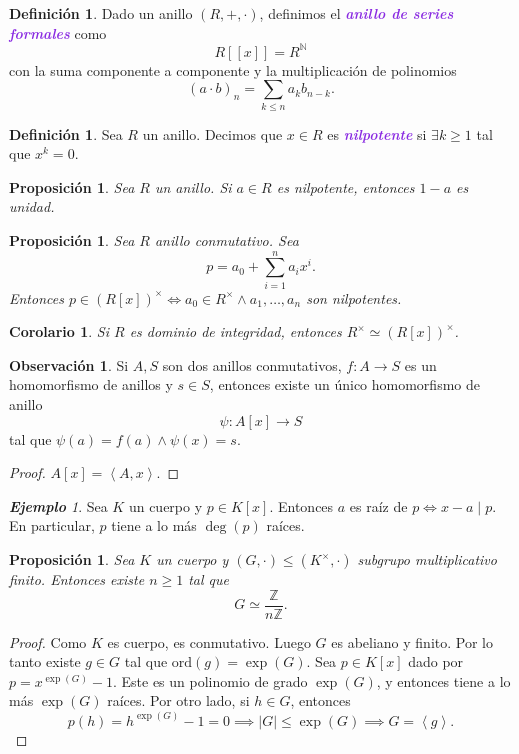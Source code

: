 \documentclass{article}
\newtheorem{corollary}[theorem]{Corolario}
\newtheorem{proposition}[theorem]{Proposición}
\theoremstyle{definition}
\newtheorem{definition}[theorem]{Definición}
\newtheorem*{obs}{Observación}
\theoremstyle{remark}
\newtheorem{example}[theorem]{\textbf{Ejemplo}}
\numberwithin{equation}{section}
\newcommand{\N}{\mathbb{N}}
\newcommand{\Z}{\mathbb{Z}}
\renewcommand{\c}{\cdot}
\newcommand{\ord}{\mathrm{ord}}
\newcommand{\abs}[1]{\left| #1 \right|}
\newcommand{\br}[1]{\left( #1 \right)}
\newcommand{\gen}[1]{\left\langle #1 \right\rangle}
\newcommand{\znz}[1]{\frac{\Z}{#1 \Z}}
\newcommand{\wea}[1]{\textcolor{BlueViolet}{\textbf{\emph{#1}}}}
\begin{document}
\begin{definition}
  Dado un anillo $(R,+,\c)$, definimos el \wea{anillo de series formales} como 
  \[ R[[x]] = R^\N \]
  con la suma componente a componente y la multiplicación de polinomios 
  \[ (a \c b)_n = \sum_{k \leq n} a_k b_{n-k}. \]
\end{definition}

\begin{definition}
  Sea $R$ un anillo. Decimos que $x \in R$ es \wea{nilpotente} si $\exists k \geq 1$ tal que $x^k = 0$.
\end{definition}

\begin{proposition}
  Sea $R$ un anillo. Si $a \in R$ es nilpotente, entonces $1-a$ es unidad. %
\end{proposition}

\begin{proposition}
  Sea $R$ anillo conmutativo. Sea 
  \[ p = a_0 + \sum_{i=1}^n a_i x^i. \]
  Entonces $p \in \br{R[x]}^\times \iff a_0 \in R^\times \land a_1,\dots,a_n$ son nilpotentes.
\end{proposition}

\begin{corollary}
  Si $R$ es dominio de integridad, entonces $R^\times \simeq (R[x])^\times$.
\end{corollary}

\begin{obs}
  Si $A,S$ son dos anillos conmutativos, $f \colon A \to S$ es un homomorfismo de anillos y $s \in S$, entonces existe un único homomorfismo de anillo 
  \[ \psi \colon A[x] \to S \]
  tal que $\psi(a) = f(a) \land \psi(x) = s$.
\end{obs}
\begin{proof}
  $A[x] = \gen{A,x}$.
\end{proof}

\begin{example}
  Sea $K$ un cuerpo y $p \in K[x]$. Entonces $a$ es raíz de $p \iff x-a \mid p$.
  En particular, $p$ tiene a lo más $\deg(p)$ raíces.
\end{example}

\begin{proposition}
  Sea $K$ un cuerpo y $(G,\c) \leqslant (K^\times,\c)$ subgrupo multiplicativo finito. Entonces existe $n \geq 1$ tal que 
  \[ G \simeq \znz n. \]
\end{proposition}
\begin{proof}
  Como $K$ es cuerpo, es conmutativo. Luego $G$ es abeliano y finito. Por lo tanto existe $g \in G$ tal que $\ord(g) = \exp(G)$. Sea $p \in K[x]$ dado por $p = x^{\exp(G)} - 1$. Este es un polinomio de grado $\exp(G)$, y entonces tiene a lo más $\exp(G)$ raíces.
  Por otro lado, si $h \in G$, entonces 
  \[ p(h) = h^{\exp(G)} - 1 = 0
  \implies \abs G \leq \exp(G) \implies G = \gen g. \]
\end{proof}
\end{document}
